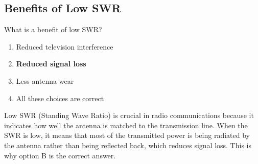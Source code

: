 \subsection{Benefits of Low SWR}
\label{T9B01}

\begin{tcolorbox}[colback=gray!10!white,colframe=black!75!black,title=T9B01]
What is a benefit of low SWR?
\begin{enumerate}[noitemsep]
    \item Reduced television interference
    \item \textbf{Reduced signal loss}
    \item Less antenna wear
    \item All these choices are correct
\end{enumerate}
\end{tcolorbox}

Low SWR (Standing Wave Ratio) is crucial in radio communications because it indicates how well the antenna is matched to the transmission line. When the SWR is low, it means that most of the transmitted power is being radiated by the antenna rather than being reflected back, which reduces signal loss. This is why option B is the correct answer.